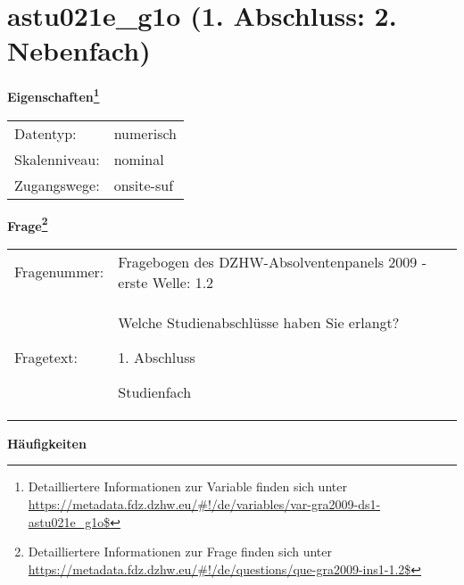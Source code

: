 
    \setcounter{footnote}{0}

    \vspace*{-1.8cm}
	\section{astu021e\_g1o (1. Abschluss: 2. Nebenfach)}
	\label{section:astu021e_g1o}



    \vspace*{0.5cm}
    \noindent\textbf{Eigenschaften\footnote{Detailliertere Informationen zur Variable finden sich unter
		\url{https://metadata.fdz.dzhw.eu/\#!/de/variables/var-gra2009-ds1-astu021e_g1o$}}}\\
	\begin{tabularx}{\hsize}{@{}lX}
	Datentyp: & numerisch \\
	Skalenniveau: & nominal \\
	Zugangswege: &
	  onsite-suf
 \\
    \end{tabularx}



				\vspace*{0.5cm}
                \noindent\textbf{Frage\footnote{Detailliertere Informationen zur Frage finden sich unter
		              \url{https://metadata.fdz.dzhw.eu/\#!/de/questions/que-gra2009-ins1-1.2$}}}\\
				\begin{tabularx}{\hsize}{@{}lX}
					Fragenummer: &
					  Fragebogen des DZHW-Absolventenpanels 2009 - erste Welle:
					  1.2
 \\
					Fragetext: & Welche Studienabschlüsse haben Sie erlangt?\par  1. Abschluss\par  Studienfach \\
				\end{tabularx}





        		\vspace*{0.5cm}
                \noindent\textbf{Häufigkeiten}

